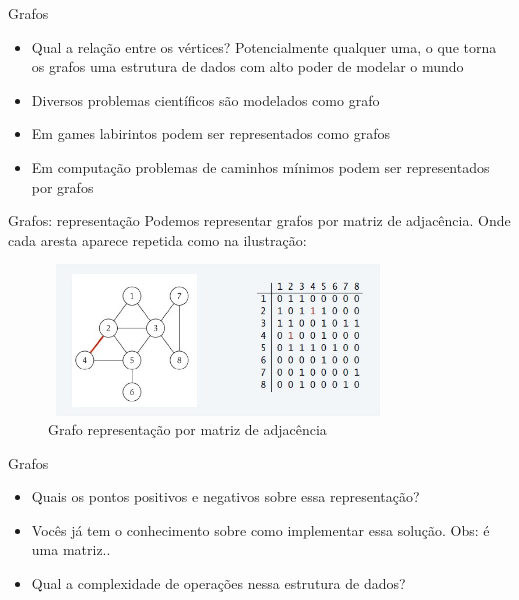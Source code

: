 \begin{frame}
	\begin{block}{Grafos}
		\begin{itemize}
			\item Qual a relação entre os vértices? Potencialmente qualquer uma, o que torna os grafos uma estrutura de dados com alto poder de modelar o mundo
			\item Diversos problemas científicos são modelados como grafo	
			\item Em games labirintos podem ser representados como grafos	
			\item Em computação problemas de caminhos mínimos podem ser representados por grafos
		\end{itemize}
	\end{block}
\end{frame}


\begin{frame}
	\begin{block}{Grafos: representação}
		Podemos representar grafos por matriz de adjacência. Onde cada aresta aparece repetida como na ilustração:
		\begin{figure}[!htb]
			\centering	  				
			\includegraphics[height=4cm, width = 9cm]{./pic/matrizAdjacencia.jpg}
			\caption{Grafo representação por matriz de adjacência}
			\label{fig_pilha}
		\end{figure}
	\end{block}
\end{frame}

\begin{frame}
	\begin{block}{Grafos}
		\begin{itemize}
			\item Quais os pontos positivos e negativos sobre essa representação?	
			\item Vocês já tem o conhecimento sobre como implementar essa solução. Obs: é uma matriz..	
			\item Qual a complexidade de operações nessa estrutura de dados?
		\end{itemize}
	\end{block}
\end{frame}

